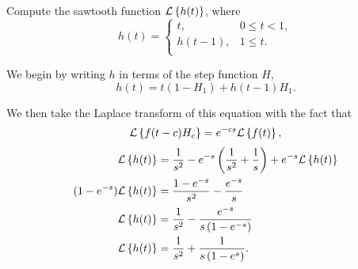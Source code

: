 \documentclass[../hw7]{subfiles}
\begin{document}
Compute the sawtooth function $\mathcal{L}\left\{h(t)\right\}$, where \[h(t)=\begin{cases}
    t, & 0\leq t < 1, \\
    h(t-1), & 1 \leq t. \\
\end{cases}\]

We begin by writing $h$ in terms of the step function $H$,
\[h(t)=t(1-H_1)+h(t-1)H_1.\]

We then take the Laplace transform of this equation with the fact that \[\mathcal{L}\left\{f(t-c)H_c\right\}=e^{-cs}\mathcal{L}\left\{f(t)\right\},\]
\begin{align*}
    \mathcal{L}\left\{h(t)\right\}&=\frac{1}{s^2}-e^{-s}\left( \frac{1}{s^2}+\frac{1}{s} \right)+e^{-s}\mathcal{L}\left\{h(t)\right\} \\
    (1-e^{-s})\mathcal{L}\left\{h(t)\right\}&=\frac{1-e^{-s}}{s^2}-\frac{e^{-s}}{s} \\
    \mathcal{L}\left\{h(t)\right\}&=\frac{1}{s^2}-\frac{e^{-s}}{s\left( 1-e^{-s} \right)} \\
    \mathcal{L}\left\{h(t)\right\}&=\frac{1}{s^2}+\frac{1}{s\left( 1-e^s \right)}. \\
\end{align*}
\end{document}
